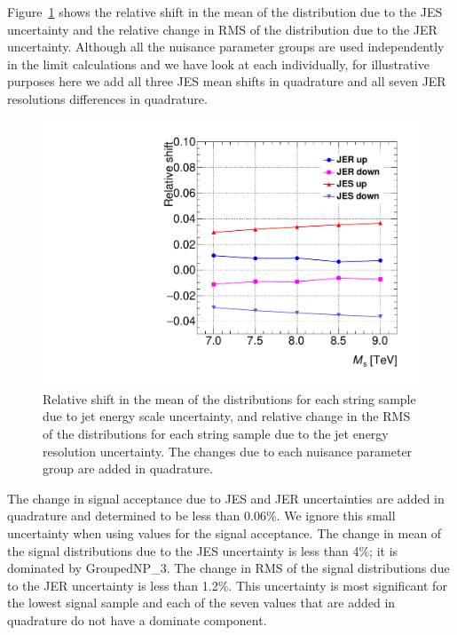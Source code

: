 Figure~\ref{fig3} shows the relative shift in the mean of the \mjj
distribution due to the JES uncertainty and the relative change in RMS
of the \mjj distribution due to the JER uncertainty. 
Although all the nuisance parameter groups are used independently in the
limit calculations and we have look at each individually, for
illustrative purposes here we add all three JES mean shifts in quadrature
and all seven JER resolutions differences in quadrature. 

\begin{figure}[htb]
\begin{center}
\includegraphics[width=0.7\linewidth]{figures/strings/JES_JER}
\end{center}
\caption{Relative shift in the mean of the \mjj distributions for each
string sample due to jet energy scale uncertainty, and relative change
in the RMS of the \mjj distributions for each string sample due to the
jet energy resolution uncertainty.
The changes due to each nuisance parameter group are added in
quadrature.}
\label{fig3}
\end{figure}

The change in signal acceptance due to JES and JER uncertainties are
added in quadrature and determined to be less than 0.06\%. 
We ignore this small uncertainty when using values for the signal
acceptance.
The change in mean of the signal distributions due to the JES uncertainty is
less than 4\%; it is dominated by GroupedNP\_3. 
The change in RMS of the signal distributions due to the JER uncertainty
is less than 1.2\%.
This uncertainty is most significant for the lowest \Ms signal sample and
each of the seven values that are added in quadrature do not have a
dominate component.


